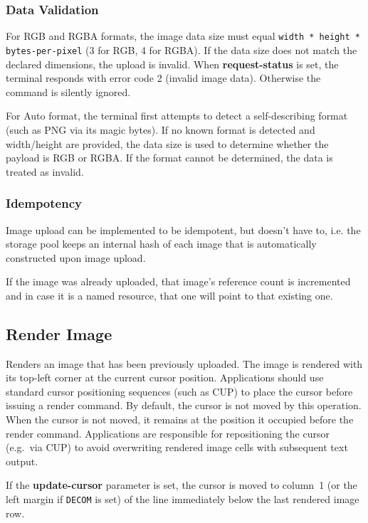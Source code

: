 \documentclass[a4paper]{article}
\newcommand{\code}[1]{\colorbox{light-gray}{\texttt{#1}}}
\begin{document}
\subsubsection{Data Validation}

For RGB and RGBA formats, the image data size must equal
\code{width * height * bytes-per-pixel} (3 for RGB, 4 for RGBA).
If the data size does not match the declared dimensions, the upload is invalid.
When \textbf{request-status} is set, the terminal responds with error code 2 (invalid image data).
Otherwise the command is silently ignored.

For Auto format, the terminal first attempts to detect a self-describing format
(such as PNG via its magic bytes). If no known format is detected and width/height
are provided, the data size is used to determine whether the payload is RGB or RGBA.
If the format cannot be determined, the data is treated as invalid.

\subsubsection{Idempotency}

Image upload can be implemented to be idempotent, but doesn't have to,
i.e. the storage pool keeps an internal hash of each image that is
automatically constructed upon image upload.

If the image was already uploaded, that image's reference count is incremented
and in case it is a named resource, that one will point to that existing one.

\subsection{Render Image} %

Renders an image that has been previously uploaded.
The image is rendered with its top-left corner at the current cursor position.
Applications should use standard cursor positioning sequences (such as CUP) to place
the cursor before issuing a render command.
By default, the cursor is not moved by this operation.
When the cursor is not moved, it remains at the position it occupied
before the render command. Applications are responsible for repositioning
the cursor (e.g.\ via CUP) to avoid overwriting rendered image cells with
subsequent text output.

If the \textbf{update-cursor} parameter is set,
the cursor is moved to column~1 (or the left margin if \code{DECOM} is set)
of the line immediately below the last rendered image row.
\end{document}
